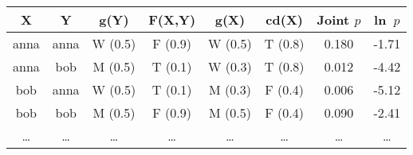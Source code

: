 \begin{tabular}{|c|c|c|c|c|c||c|c|}
\hline
X & Y & g(Y) & F(X,Y) & g(X) & cd(X) & Joint $p$ & ln~$p$ \\ \hline
anna & anna & W (0.5) & F (0.9) & W (0.5) & T (0.8) & 0.180 & -1.71\\
anna & bob & M (0.5) & T (0.1) & W (0.3) & T (0.8) & 0.012 & -4.42\\
bob & anna & W (0.5) & T (0.1) & M (0.3) & F (0.4) & 0.006 & -5.12\\
bob & bob & M (0.5) & F (0.9) & M (0.5) & F (0.4) & 0.090 & -2.41\\
\ldots & \ldots & \ldots & \ldots & \ldots & \ldots & \ldots & \ldots\\
\hline
\end{tabular}
